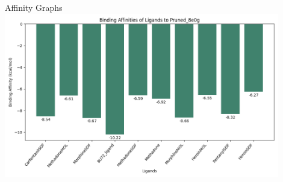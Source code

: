 \documentclass{beamer}
\begin{document}
\begin{frame}{Affinity Graphs}
\includegraphics[width=12cm]{img/Graphs/Pruned_8e0g_affinities.png}
\end{frame}
\end{document}
